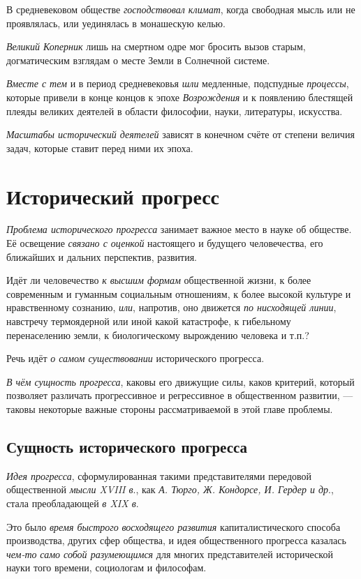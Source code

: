 \documentclass[a4paper,14pt,russian]{extreport}
\begin{document}
В средневековом обществе \emph{господствовал климат}, когда свободная мысль или не проявлялась, или уединялась в монашескую келью.

\emph{Великий Коперник} лишь на смертном одре мог бросить вызов старым, догматическим взглядам о месте Земли в Солнечной системе.

\emph{Вместе с тем} и в период средневековья \emph{шли} медленные, подспудные \emph{процессы}, которые привели в конце концов к эпохе \emph{Возрождения} и к появлению блестящей плеяды великих деятелей в области философии, науки, литературы, искусства.

\emph{Масштабы исторический деятелей} зависят в конечном счёте от степени величия задач, которые ставит перед ними их эпоха.

\section{Исторический прогресс}

\emph{Проблема исторического прогресса} занимает важное место в науке об обществе. Её освещение \emph{связано с оценкой} настоящего и будущего человечества, его ближайших и дальних перспектив, развития.

Идёт ли человечество \emph{к высшим формам} общественной жизни, к более современным и гуманным социальным отношениям, к более высокой культуре и нравственному сознанию, \emph{или}, напротив, оно движется \emph{по нисходящей линии}, навстречу термоядерной или иной какой катастрофе, к гибельному перенаселению земли, к биологическому вырождению человека и т.п.?

Речь идёт \emph{о самом существовании} исторического прогресса.

\emph{В чём сущность прогресса}, каковы его движущие силы, каков критерий, который позволяет различать прогрессивное и регрессивное в общественном развитии, --- таковы некоторые важные стороны рассматриваемой в этой главе проблемы.

\subsection{Сущность исторического прогресса}

\emph{Идея прогресса}, сформулированная такими представителями передовой общественной \emph{мысли XVIII в}., как \emph{А. Тюрго, Ж. Кондорсе, И. Гердер и др}., стала преобладающей \emph{в XIX в}.

Это было \emph{время быстрого} \emph{восходящего развития} капиталистического способа производства, других сфер общества, и идея общественного прогресса казалась \emph{чем-то} \emph{само собой разумеющимся} для многих представителей исторической науки того времени, социологам и философам.
\end{document}

